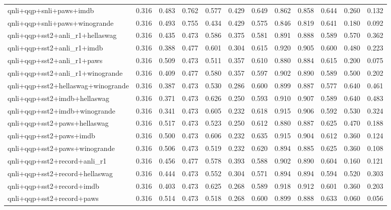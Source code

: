 \begin{table}[t]
\begin{tabular}{lrrrrrrrrrrr}
    qnli+qqp+snli+paws+imdb & 0.316 & 0.483 & 0.762 & 0.577 & 0.429 & 0.649 & 0.862 & 0.858 & 0.644 & 0.260 & 0.132 \\
    qnli+qqp+snli+paws+winogrande & 0.316 & 0.493 & 0.755 & 0.434 & 0.429 & 0.575 & 0.846 & 0.819 & 0.641 & 0.180 & 0.092 \\
    qnli+qqp+sst2+anli\_r1+hellaswag & 0.316 & 0.435 & 0.473 & 0.586 & 0.375 & 0.581 & 0.891 & 0.888 & 0.589 & 0.570 & 0.362 \\
    qnli+qqp+sst2+anli\_r1+imdb & 0.316 & 0.388 & 0.477 & 0.601 & 0.304 & 0.615 & 0.920 & 0.905 & 0.600 & 0.480 & 0.223 \\
    qnli+qqp+sst2+anli\_r1+paws & 0.316 & 0.509 & 0.473 & 0.511 & 0.357 & 0.610 & 0.880 & 0.884 & 0.615 & 0.200 & 0.075 \\
    qnli+qqp+sst2+anli\_r1+winogrande & 0.316 & 0.409 & 0.477 & 0.580 & 0.357 & 0.597 & 0.902 & 0.890 & 0.589 & 0.500 & 0.202 \\
    qnli+qqp+sst2+hellaswag+winogrande & 0.316 & 0.387 & 0.473 & 0.530 & 0.286 & 0.600 & 0.899 & 0.887 & 0.577 & 0.640 & 0.461 \\
    qnli+qqp+sst2+imdb+hellaswag & 0.316 & 0.371 & 0.473 & 0.626 & 0.250 & 0.593 & 0.910 & 0.907 & 0.589 & 0.640 & 0.483 \\
    qnli+qqp+sst2+imdb+winogrande & 0.316 & 0.341 & 0.473 & 0.605 & 0.232 & 0.618 & 0.915 & 0.906 & 0.592 & 0.530 & 0.324 \\
    qnli+qqp+sst2+paws+hellaswag & 0.316 & 0.517 & 0.473 & 0.523 & 0.250 & 0.612 & 0.880 & 0.887 & 0.625 & 0.470 & 0.188 \\
    qnli+qqp+sst2+paws+imdb & 0.316 & 0.500 & 0.473 & 0.606 & 0.232 & 0.635 & 0.915 & 0.904 & 0.612 & 0.360 & 0.124 \\
    qnli+qqp+sst2+paws+winogrande & 0.316 & 0.506 & 0.473 & 0.519 & 0.232 & 0.620 & 0.894 & 0.885 & 0.625 & 0.360 & 0.108 \\
    qnli+qqp+sst2+record+anli\_r1 & 0.316 & 0.456 & 0.477 & 0.578 & 0.393 & 0.588 & 0.902 & 0.890 & 0.604 & 0.160 & 0.121 \\
    qnli+qqp+sst2+record+hellaswag & 0.316 & 0.444 & 0.473 & 0.552 & 0.304 & 0.571 & 0.894 & 0.894 & 0.594 & 0.520 & 0.303 \\
    qnli+qqp+sst2+record+imdb & 0.316 & 0.403 & 0.473 & 0.625 & 0.268 & 0.589 & 0.918 & 0.912 & 0.601 & 0.360 & 0.203 \\
    qnli+qqp+sst2+record+paws & 0.316 & 0.514 & 0.473 & 0.518 & 0.268 & 0.600 & 0.899 & 0.888 & 0.633 & 0.060 & 0.056 \\

\end{tabular}
\end{table}
